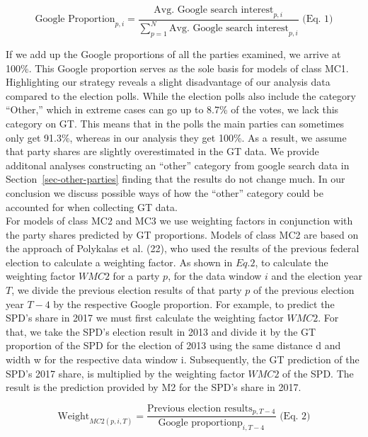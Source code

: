 \documentclass[
  letterpaper,
  DIV=11,
  numbers=noendperiod]{scrartcl}
\begin{document}
\[\text{Google Proportion}_{p,i}=\frac{\text{Avg. Google search interest}_{p,i}}{\sum_{p=1}^{N} \text{Avg. Google search interest}_{p,i}}\text{ (Eq. 1)}\]

If we add up the Google proportions of all the parties examined, we
arrive at 100\%. This Google proportion serves as the sole basis for
models of class MC1. Highlighting our strategy reveals a slight
disadvantage of our analysis data compared to the election polls. While
the election polls also include the category ``Other,'' which in extreme
cases can go up to 8.7\% of the votes, we lack this category on GT. This
means that in the polls the main parties can sometimes only get 91.3\%,
whereas in our analysis they get 100\%. As a result, we assume that
party shares are slightly overestimated in the GT data. We provide
additonal analyses constructing an ``other'' category from google search
data in Section~\ref{sec-other-parties} finding that the results do not
change much. In our conclusion we discuss possible ways of how the
``other'' category could be accounted for when collecting GT data.\\
For models of class MC2 and MC3 we use weighting factors in conjunction
with the party shares predicted by GT proportions. Models of class MC2
are based on the approach of Polykalas et al. (22), who used the results
of the previous federal election to calculate a weighting factor. As
shown in \(Eq. 2\), to calculate the weighting factor \(WMC2\) for a
party \(p\), for the data window \(i\) and the election year \(T\), we
divide the previous election results of that party \(p\) of the previous
election year \(T-4\) by the respective Google proportion. For example,
to predict the SPD's share in 2017 we must first calculate the weighting
factor \(WMC2\). For that, we take the SPD's election result in 2013 and
divide it by the GT proportion of the SPD for the election of 2013 using
the same distance d and width w for the respective data window i.
Subsequently, the GT prediction of the SPD's 2017 share, is multiplied
by the weighting factor \(WMC2\) of the SPD. The result is the
prediction provided by M2 for the SPD's share in 2017.

\[\text{Weight}_{MC2(p,i,T)}=\frac{\text{Previous election results}_{p,T-4}}{\text{Google proportionp}_{i,T-4}}\text{ (Eq. 2)}\]
\end{document}
